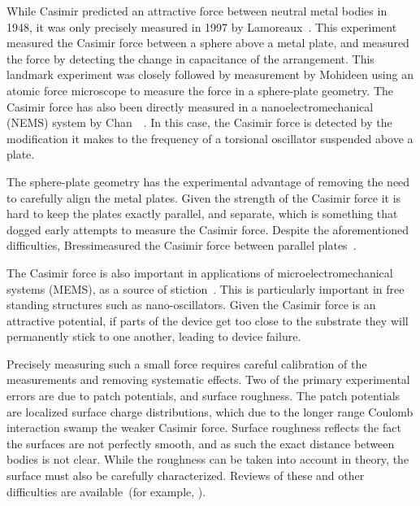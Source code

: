 While Casimir predicted an attractive force between neutral metal bodies in 1948,
it was only precisely measured in 1997 by Lamoreaux~\cite{Lamoreaux1997}.   
This experiment measured the Casimir force between a sphere above a metal plate,
and measured the force by detecting the change in capacitance of the arrangement.  
This landmark experiment was closely followed by measurement by Mohideen\etal\cite{Mohideen1998}
using an atomic force microscope to measure the force in a sphere-plate geometry.  
The Casimir force has also been directly measured in a nanoelectromechanical (NEMS) system 
by Chan~\etal~\cite{Chan2001}.  In this case, the Casimir force is detected by the modification it
makes to the frequency of a torsional oscillator suspended above a plate.  

The sphere-plate geometry has the experimental advantage of removing the need to carefully
align the metal plates. Given the strength of the Casimir force it is hard to keep the plates exactly parallel,
and separate, which is something that dogged early attempts to measure the Casimir force.
Despite the aforementioned difficulties, Bressi\etal measured the Casimir force between parallel plates~\cite{Bressi2002}.  

The Casimir force is also important in applications of microelectromechanical systems (MEMS), 
as a source of stiction~\cite{Tas1996, Serry1998, Buks2001}.  This is particularly important
in free standing structures such as nano-oscillators.  
Given the Casimir force is an attractive potential, if parts of the device get too close to the substrate
they will permanently stick to one another, leading to device failure.  

Precisely measuring such a small force requires careful calibration of the measurements 
and removing systematic effects.  Two of the primary experimental errors are due to 
patch potentials, and surface roughness.  The patch potentials are localized surface 
charge distributions, which due to the longer range Coulomb interaction swamp the weaker
Casimir force.  Surface roughness reflects the fact the surfaces are not perfectly smooth,
and as such the exact distance between bodies is not clear.  While the roughness can be taken into
account in theory, the surface must also be carefully characterized.  Reviews of these and other 
difficulties are available~(for example, \cite{Dalvit2011}).

